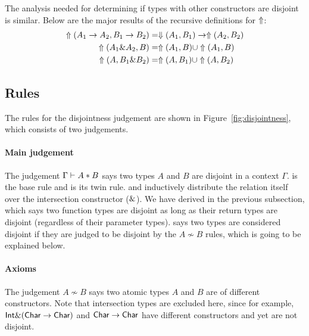 The analysis needed for determining if types with other constructors are
disjoint is similar. Below are the major results of the recursive definitions for
$\Uparrow$:
\begin{align*}
  \Uparrow(A_1 \to A_2, B_1 \to B_2) &= \Downarrow(A_1,B_1) \to \Uparrow(A_2,B_2) \\
  \Uparrow({A_1 \& A_2, B})      &= \Uparrow(A_1, B) \cup \Uparrow(A_1,B) \\
  \Uparrow({A, B_1 \& B_2})      &= \Uparrow(A, B_1) \cup \Uparrow(A,B_2)
\end{align*}

\subsection{Rules}

The rules for the disjointness judgement are shown in
Figure~\ref{fig:disjointness}, which consists of two judgements.

\paragraph{Main judgement} The judgement $\Gamma \vdash A * B$ says two types
$A$ and $B$ are disjoint in a context $\Gamma$.  is the
base rule and  is its twin rule.
 and  inductively distribute
the relation itself over the intersection constructor ($\&$). We have
derived  in the previous subsection, which says two
function types are disjoint as long as their return types are disjoint
(regardless of their parameter types).  says two types
are considered disjoint if they are judged to be disjoint by the $A \not \sim B$
rules, which is going to be explained below.

\paragraph{Axioms} The judgement $A \not \sim B$ says two atomic types $A$ and
$B$ are of different constructors. Note that intersection types are excluded
here, since for example, $\textsf{Int} \& (\textsf{Char} \to \textsf{Char})$ and $\textsf{Char} \to
\textsf{Char}$ have different constructors and yet are not disjoint.

